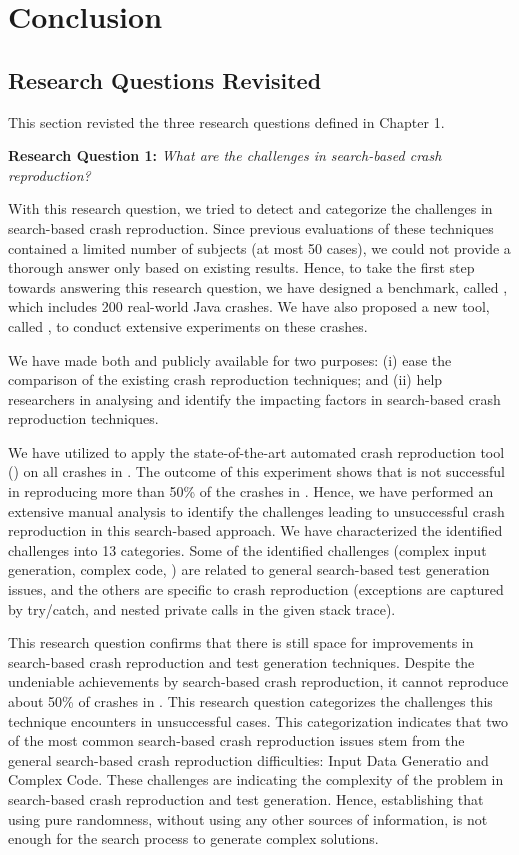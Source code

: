 \chapter{Conclusion}
\label{conclusion}

\section{Research Questions Revisited}

This section revisted the three research questions defined in Chapter 1.


\textbf{Research Question 1: }\textit{What are the challenges in search-based crash reproduction?}

With this research question, we tried to detect and categorize the challenges in search-based crash reproduction. Since previous evaluations of these techniques contained a limited number of subjects (at most 50 cases), we could not provide a thorough answer only based on existing results. Hence, to take the first step towards answering this research question, we have designed a benchmark, called \crashpack, which includes 200 real-world Java crashes. We have also proposed a new tool, called \exrunner, to conduct extensive experiments on these crashes.

We have made both \crashpack and \exrunner publicly available for two purposes: 
(i) ease the comparison of the existing crash reproduction techniques; and 
(ii) help researchers in analysing and identify the impacting factors in search-based crash reproduction techniques.

We have utilized \exrunner to apply the state-of-the-art automated crash reproduction tool (\evocrash) on all crashes in \jcrashpack. The outcome of this experiment shows that \evocrash is not successful in reproducing more than 50\% of the crashes in \jcrashpack. Hence, we have performed an extensive manual analysis to identify the challenges leading to unsuccessful crash reproduction in this search-based approach. We have characterized the identified challenges into 13 categories. Some of the identified challenges (\eg complex input generation, complex code, \etc) are related to general search-based test generation issues, and the others are specific to crash reproduction (\eg exceptions are captured by try/catch, and nested private calls in the given stack trace).


This research question confirms that there is still space for improvements in search-based crash reproduction and test generation techniques. Despite the undeniable achievements by search-based crash reproduction, it cannot reproduce about 50\% of crashes in \crashpack. 
This research question categorizes the challenges this technique encounters in unsuccessful cases. This categorization indicates that two of the most common search-based crash reproduction issues stem from the general search-based crash reproduction difficulties: Input Data Generatio and Complex Code. These challenges are indicating the complexity of the problem in search-based crash reproduction and test generation. Hence, establishing that using pure randomness, without using any other sources of information, is not enough for the search process to generate complex solutions.


